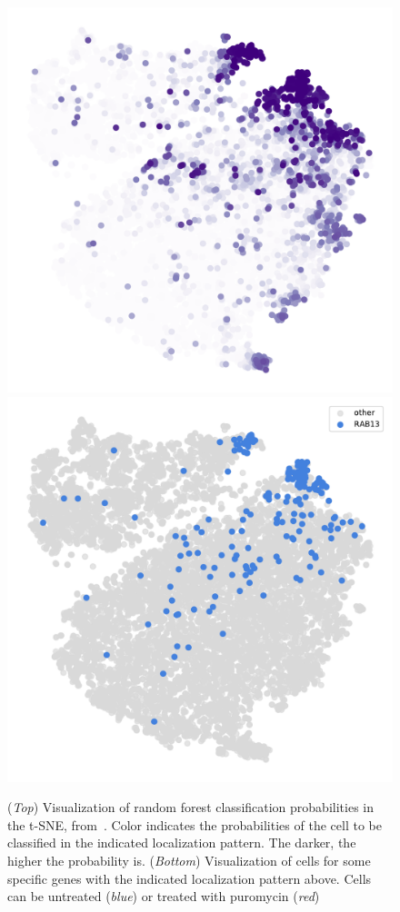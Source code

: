 \begin{figure}[h]
	\endminipage\hfill
		\includegraphics[width=\linewidth]{figures/appendix/tsne_probability_nocolorbar_protrusion}
		\vfill
		\includegraphics[width=\linewidth]{figures/appendix/tsne_protrusion_RAB13}
	\endminipage
	\caption{(\textit{Top}) Visualization of random forest classification probabilities in the t-SNE, from~\cite{CHOUAIB_2020}.
	Color indicates the probabilities of the cell to be classified in the indicated localization pattern.
	The darker, the higher the probability is.
	(\textit{Bottom}) Visualization of cells for some specific genes with the indicated localization pattern above.
	Cells can be untreated (\textit{blue}) or treated with puromycin (\textit{red})}
	\label{fig:tsne_proba_gene}
\end{figure}

